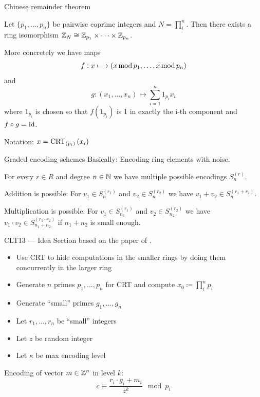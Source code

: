 \documentclass[english]{beamer}
\begin{document}
    \begin{frame}{Chinese remainder theorem}
        \begin{theorem}
            Let $\{p_1, \dots, p_n\}$ be pairwise coprime integers and $N = \prod_i^n$. Then there exists a ring isomorphism $\mathbb{Z}_N \cong \mathbb{Z}_{p_1} \times \dots \times \mathbb{Z}_{p_n}$.
        \end{theorem}

        More concretely we have maps
        \begin{equation*}
            f : x \longmapsto (x \operatorname{mod} p_1, \dots, x \operatorname{mod} p_n)
        \end{equation*}
        and
        \begin{equation*}
            g : (x_1, \dots, x_n) \longmapsto \sum_{i=1}^n 1_{p_i}x_i
        \end{equation*}
        where $1_{p_i}$ is chosen so that $f\left(1_{p_i}\right)$ is 1 in exactly the i-th component and $f \circ g = \operatorname{id}$.

        Notation: $x = \operatorname{CRT}_{(p_{i})}\left(x_i\right)$
    \end{frame}
    \begin{frame}{Graded encoding schemes}
        Basically: Encoding ring elements with noise.

        For every $r \in R$ and degree $n \in \mathbb{N}$ we have multiple possible encodings $S^{(r)}_n$.

        Addition is possible: For $v_1 \in S^{(r_1)}_n$ and $v_2 \in S^{(r_2)}_n$ we have $v_1 + v_2 \in S^{(r_1 + r_2)}_n$.

        Multiplication is possible: For $v_1 \in S^{(r_1)}_{n_1}$ and $v_2 \in S^{(r_2)}_{n_2}$ we have $v_1 \cdot v_2 \in S^{(r_1 \cdot r_2)}_{n_1 + n_2}$ if $n_1 + n_2$ is small enough.
    \end{frame}
    \begin{frame}{CLT13 --- Idea}
        Section based on the paper of .

        \begin{itemize}
            \item Use CRT to hide computations in the smaller rings by doing them concurrently in the larger ring
            \item Generate $n$ primes $p_1, \dots, p_n$ for CRT and compute $x_0 \coloneqq \prod_i^n p_i$
            \item Generate \enquote{small} primes $g_1, \dots, g_n$
            \item Let $r_1, \dots, r_n$ be \enquote{small} integers
            \item Let $z$ be random integer
            \item Let $\kappa$ be max encoding level
        \end{itemize}

        Encoding of vector $m \in \mathbb{Z}^n$ in level $k$:
        \begin{equation*}
            c \equiv \frac{r_i \cdot g_i + m_i}{z^k} \mod p_i
        \end{equation*}
    \end{frame}
\end{document}
